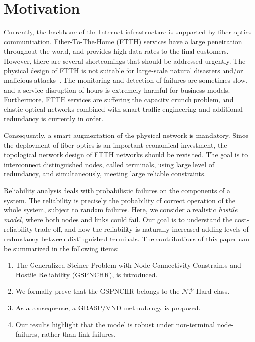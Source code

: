 \documentclass{llncs}
\begin{document}
\section{Motivation}\label{sect:intro}
Currently, the backbone of the Internet infrastructure is supported by fiber-optics communication. Fiber-To-The-Home (FTTH) services have a large penetration throughout the world, and provides high data rates to the final customers. 
However, there are several shortcomings that should be addressed urgently. The physical design of FTTH is not suitable for 
large-scale natural disasters and/or malicious attacks~\cite{116}. The monitoring and detection of failures are sometimes slow, and a service disruption of hours is extremely harmful for business models. Furthermore, FTTH services are suffering the capacity crunch problem, and elastic optical networks combined with smart traffic engineering and additional redundancy is currently in order.

Consequently, a smart augmentation of the physical network is mandatory. Since the deployment of fiber-optics is an important economical investment, the topological network design of FTTH networks should be revisited. The goal is to interconnect 
distinguished nodes, called terminals, using large level of redundancy, and simultaneously, meeting large reliable constraints.

Reliability analysis deals with probabilistic failures on the components of a system. The reliability is precisely the 
probability of correct operation of the whole system, subject to random failures. Here, we consider a realistic \emph{hostile model}, where both nodes and links could fail. Our goal is to understand the cost-reliability trade-off, and how the reliability is naturally increased adding levels of redundancy between distinguished terminals. 
The contributions of this paper can be summarized in the following items:
\begin{enumerate}
\item The Generalized Steiner Problem with Node-Connectivity Constraints and Hostile Reliability (GSPNCHR), is introduced. 
\item We formally prove that the GSPNCHR belongs to the $\mathcal{NP}$-Hard class. 
\item As a consequence, a GRASP/VND methodology is proposed.
\item Our results highlight that the model is robust under non-terminal node-failures, rather than link-failures.
\end{enumerate}
\end{document}
